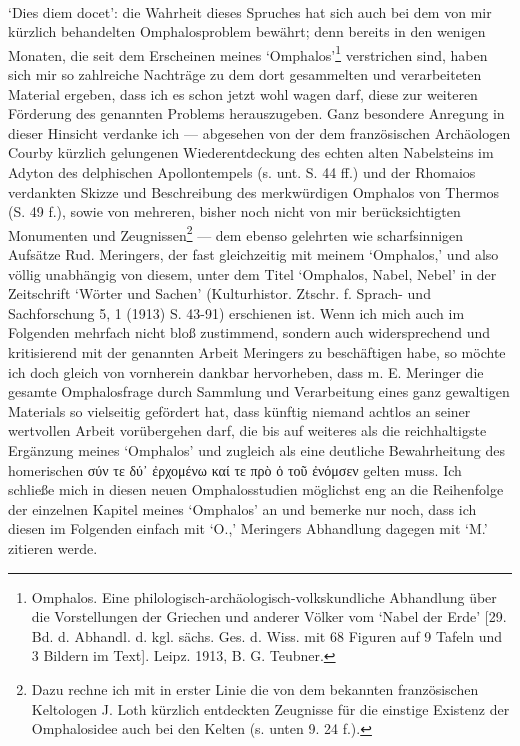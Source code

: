 \documentclass[a4paper, 11pt, oneside]{article}
\begin{document}
\paragraph{}
`Dies diem docet': die Wahrheit dieses Spruches hat sich auch bei dem von mir kürzlich behandelten Omphalosproblem bewährt; denn bereits in den wenigen Monaten, die seit dem Erscheinen meines `Omphalos'\footnote{Omphalos. Eine philologisch-archäologisch-volkskundliche Abhandlung über die Vorstellungen der Griechen und anderer Völker vom `Nabel der Erde' [29. Bd. d. Abhandl. d. kgl. sächs. Ges. d. Wiss. mit 68 Figuren auf 9 Tafeln und 3 Bildern im Text]. Leipz. 1913, B. G. Teubner.} verstrichen sind, haben sich mir so zahlreiche Nachträge zu dem dort gesammelten und verarbeiteten Material ergeben, dass ich es schon jetzt wohl wagen darf, diese zur weiteren Förderung des genannten Problems herauszugeben. Ganz besondere Anregung in dieser Hinsicht verdanke ich --- abgesehen von der dem französischen Archäologen Courby kürzlich gelungenen Wiederentdeckung des echten alten Nabelsteins im Adyton des delphischen Apollontempels (s. unt. S. 44 ff.) und der Rhomaios verdankten Skizze und Beschreibung des merkwürdigen Omphalos von Thermos (S. 49 f.), sowie von mehreren, bisher noch nicht von mir berücksichtigten Monumenten und Zeugnissen\footnote{Dazu rechne ich mit in erster Linie die von dem bekannten französischen Keltologen J. Loth kürzlich entdeckten Zeugnisse für die einstige Existenz der Omphalosidee auch bei den Kelten (s. unten 9. 24 f.).} --- dem ebenso gelehrten wie scharfsinnigen Aufsätze Rud. Meringers, der fast gleichzeitig mit meinem `Omphalos,' und also völlig unabhängig von diesem, unter dem Titel `Omphalos, Nabel, Nebel' in der Zeitschrift `Wörter und Sachen' (Kulturhistor. Ztschr. f. Sprach- und Sachforschung 5, 1 (1913) S. 43-91) erschienen ist. Wenn ich mich auch im Folgenden mehrfach nicht bloß zustimmend, sondern auch widersprechend und kritisierend mit der genannten Arbeit Meringers zu beschäftigen habe, so möchte ich doch gleich von vornherein dankbar hervorheben, dass m. E. Meringer die gesamte Omphalosfrage durch Sammlung und Verarbeitung eines ganz gewaltigen Materials so vielseitig gefördert hat, dass künftig niemand achtlos an seiner wertvollen Arbeit vorübergehen darf, die bis auf weiteres als die reichhaltigste Ergänzung meines `Omphalos' und zugleich als eine deutliche Bewahrheitung des homerischen σύν τε δύ᾽ ἐρχομένω καί τε πρὸ ὁ τοῦ ἐνόμσεν gelten muss. Ich schließe mich in diesen neuen Omphalosstudien möglichst eng an die Reihenfolge der einzelnen Kapitel meines `Omphalos' an und bemerke nur noch, dass ich diesen im Folgenden einfach mit `O.,' Meringers Abhandlung dagegen mit `M.' zitieren werde.
\clearpage
\end{document}
